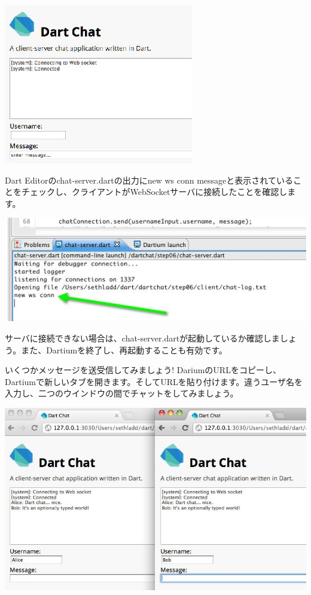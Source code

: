 \includegraphics{step7/img_60.jpg}

Dart Editorのchat-server.dartの出力にnew ws conn messageと表示されていることをチェックし、クライアントがWebSocketサーバに接続したことを確認します。

\includegraphics{step7/img_61.jpg}

サーバに接続できない場合は、chat-server.dartが起動しているか確認しましょう。また、Dartiumを終了し、再起動することも有効です。

いくつかメッセージを送受信してみましょう! DariumのURLをコピーし、Dartiumで新しいタブを開きます。そしてURLを貼り付けます。違うユーザ名を入力し、二つのウインドウの間でチャットをしてみましょう。

\includegraphics{step7/img_62.jpg}


